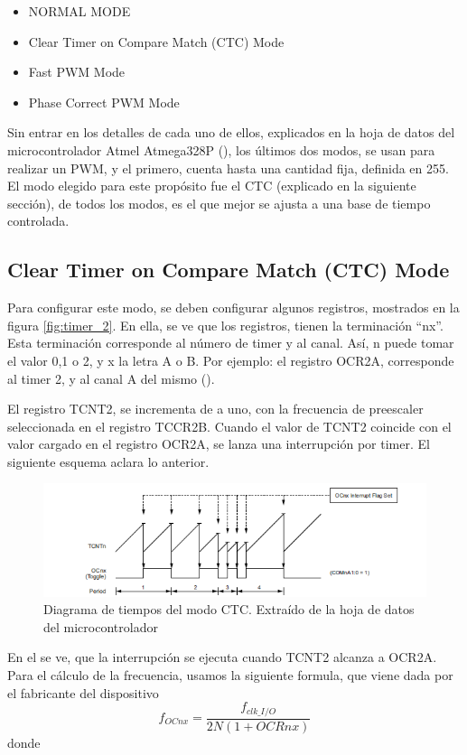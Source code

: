 \begin{itemize}
	\item NORMAL MODE 
	\item Clear Timer on Compare Match (CTC) Mode
	\item Fast PWM Mode 
	\item Phase Correct PWM Mode
\end{itemize}

Sin entrar en los detalles de cada uno de ellos, explicados en la hoja de datos del microcontrolador Atmel Atmega328P (\cite{ATmega328P}), los últimos dos modos, se usan para realizar un PWM, y el primero, cuenta hasta una cantidad fija, definida en 255. El modo elegido para este propósito fue el CTC (explicado en la siguiente sección), de todos los modos, es el que mejor se ajusta a una base de tiempo controlada. 


\subsection{Clear Timer on Compare Match (CTC) Mode }

Para configurar este modo, se deben configurar algunos registros, mostrados en la figura \ref{fig:timer_2}. En ella, se ve que los registros, tienen la terminación ``nx''. Esta terminación corresponde al número de timer y al canal. Así, n puede tomar el valor 0,1 o 2, y x la letra A o B. Por ejemplo: el registro OCR2A, corresponde al timer 2, y al canal A del mismo (\cite{ATmega328P}). 
 
El registro TCNT2, se incrementa de a uno, con la frecuencia de preescaler seleccionada en el registro TCCR2B. Cuando el valor de TCNT2 coincide con el valor cargado en el registro OCR2A, se lanza una interrupción por timer. El siguiente esquema aclara lo anterior. 

\begin{figure}[ht]
	\includegraphics{ctc_t2} 
	\caption{Diagrama de tiempos del modo CTC. Extraído de la hoja de datos del microcontrolador}
	\label{fig:ctc_isr}
\end{figure}

En el se ve, que la interrupción se ejecuta cuando TCNT2 alcanza a OCR2A. Para el cálculo de la frecuencia, usamos la siguiente formula, que viene dada por el fabricante del dispositivo
\begin{equation} \label{eq:frec_clk_isr2}
	f_{OCnx} = \frac{f_{clk \_ I/O}}{2N(1+OCRnx)}
\end{equation}
donde 


